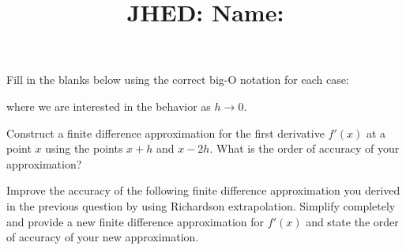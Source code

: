 \documentclass[reqno]{exam}
\title{\normalsize{
  JHED: \underline{\hspace{4cm}} \hspace{1em} Name: \underline{\hspace{9cm}}}
   }
\author{}
\date{}
\begin{document}
\maketitle
\vspace{-2cm} %

\begin{questions}
    \question[4] 
  Fill in the blanks below using the correct big-O notation for each case:\vspace{1.5ex}
  where we are interested in the behavior as $h \to 0$.

  \question[8]
  Construct a finite difference approximation for the first derivative $f'(x)$ at a point $x$ using the points $x + h$ and $x - 2h$. What is the order of accuracy of your approximation?

  \newpage

  \question[8]
  Improve the accuracy of the following finite difference approximation you derived in the previous question by using Richardson extrapolation. Simplify completely and provide a new finite difference approximation for $f'(x)$ and state the order of accuracy of your new approximation.


\end{questions}
\end{document}

